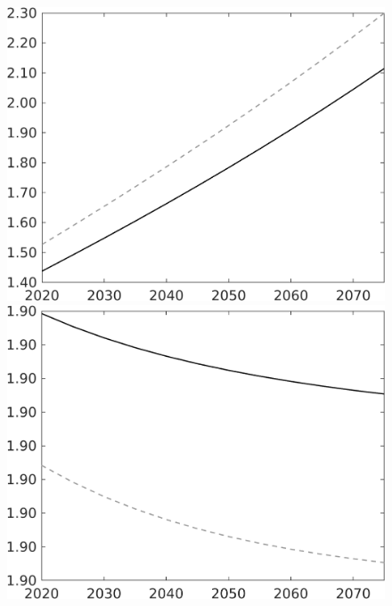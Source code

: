 \documentclass[12pt]{article}
\begin{document}
\begin{figure}[h!!]
\begin{minipage}[]{0.32\textwidth}
	\end{minipage}		
	\begin{minipage}[]{0.32\textwidth}
		\includegraphics[width=1\textwidth]{../../codding_model/own_basedOnFried/optimalPol_010922_revision/figures/all_13Sept22/LevTaufNoTauf_TaulCalib_regime0_wl_spillover0_nsk0_xgr0_knspil1_sep1_LFlimit0_emsbase0_countec0_GovRev0_etaa0.79_lgd0.png}
	\end{minipage}		
	\begin{minipage}[]{0.32\textwidth}
		\includegraphics[width=1\textwidth]{../../codding_model/own_basedOnFried/optimalPol_010922_revision/figures/all_13Sept22/LevTaufNoTauf_TaulCalib_regime0_whwl_spillover0_nsk0_xgr0_knspil1_sep1_LFlimit0_emsbase0_countec0_GovRev0_etaa0.79_lgd0.png}

\end{minipage}
\end{figure}
\end{document}
